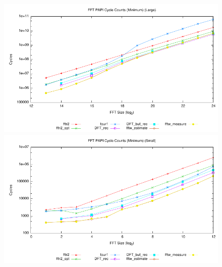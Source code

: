 \documentclass[11 pt]{article}
\begin{document}
\begin{figure}[htbp]
  \centering
	\includegraphics[width=\columnwidth]{../plots/tot_cyc_min_large}
	\includegraphics[width=\columnwidth]{../plots/tot_cyc_min_small}
  \caption{}
  \label{fig:cyc_min_size}
\end{figure}
\end{document}
